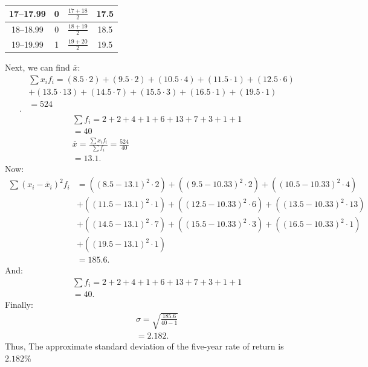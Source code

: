 \documentclass{report}
\begin{document}
\begin{mdframed}
\begin{center}
\begin{tabular}{|c|c|c|c|}
                    \hline
                    17--17.99 & 0 & $\frac{17 + 18}{2}$ & 17.5 \\
                    \hline
                    18--18.99 & 0 & $\frac{18 + 19}{2}$ & 18.5 \\
                    \hline
                    19--19.99 & 1 & $\frac{19 + 20}{2}$ & 19.5 \\
                    \hline
                    \end{tabular}
           \end{center}
           \bigbreak \noindent 
           Next, we can find $\overline{x} $:
           \begin{align*}
               &\sum x_{i}f_{i} =  (8.5\cdot 2) + (9.5\cdot 2) + (10.5 \cdot 4) + (11.5 \cdot 1) + (12.5 \cdot 6) \\
               &+ (13.5\cdot 13) + (14.5\cdot 7) + (15.5\cdot 3) + (16.5\cdot 1) + (19.5\cdot 1) \\
               &=524 \\
           .\end{align*}
           \begin{align*}
               \sum f_{i} = 2+2+4+1+6+13+7+3+1+1 \\
               = 40 \\
               \overline{x} = \frac{\sum x_{i}f_{i}}{\sum f_{i}} = \frac{524}{40} \\ = 13.1
           .\end{align*}
           \bigbreak \noindent 
           Now:
           \begin{align*}
               \sum (x_{i} - \overline{x}_{i})^{2}f_{i} &= ((8.5 - 13.1)^{2}\cdot 2) + ((9.5 - 10.33)^{2} \cdot 2) + ((10.5-10.33)^{2}\cdot 4) \\
                                               & +((11.5-13.1)^{2}\cdot 1) + ((12.5-10.33)^{2}\cdot 6) + ((13.5-10.33)^{2}\cdot 13) \\
                                               &+((14.5-13.1)^{2}\cdot 7) + ((15.5-10.33)^{2}\cdot 3) + ((16.5-10.33)^{2}\cdot 1) \\
                                               &+ ((19.5-13.1)^{2}\cdot 1) \\
                                               &= 185.6
           .\end{align*}
           And:
           \begin{align*}
               \sum f_{i} = 2+2+4+1+6+13+7+3+1+1 \\
               =40 
           .\end{align*}
           \bigbreak \noindent 
           Finally:
           \begin{align*}
               \sigma = \sqrt{\frac{185.6}{40-1}} \\
               =2.182
           .\end{align*}
           \bigbreak \noindent 
           Thus, The approximate standard deviation of the five-year rate of return is $2.182\% $
         \end{mdframed}
\end{document}
